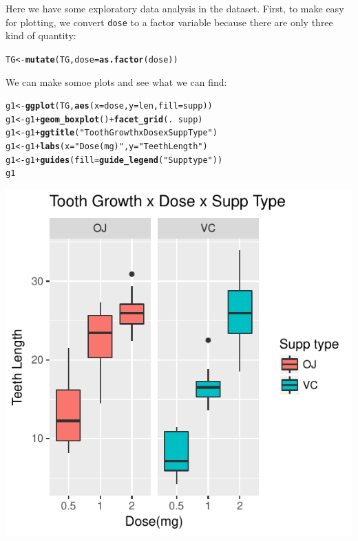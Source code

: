 \documentclass[a4paper, 12pt]{article}\usepackage[]{graphicx}\usepackage[]{color}
\makeatletter
\def\maxwidth{ %
  \ifdim\Gin@nat@width>\linewidth
    \linewidth
  \else
    \Gin@nat@width
  \fi
}
\newcommand{\hlstr}[1]{\textcolor[rgb]{0.192,0.494,0.8}{#1}}%
\newcommand{\hlopt}[1]{\textcolor[rgb]{0,0,0}{#1}}%
\newcommand{\hlstd}[1]{\textcolor[rgb]{0.345,0.345,0.345}{#1}}%
\newcommand{\hlkwb}[1]{\textcolor[rgb]{0.69,0.353,0.396}{#1}}%
\newcommand{\hlkwc}[1]{\textcolor[rgb]{0.333,0.667,0.333}{#1}}%
\newcommand{\hlkwd}[1]{\textcolor[rgb]{0.737,0.353,0.396}{\textbf{#1}}}%
\newenvironment{kframe}{%
 \def\at@end@of@kframe{}%
 \ifinner\ifhmode%
  \def\at@end@of@kframe{\end{minipage}}%
  \begin{minipage}{\columnwidth}%
 \fi\fi%
 \def\FrameCommand##1{\hskip\@totalleftmargin \hskip-\fboxsep
 \colorbox{shadecolor}{##1}\hskip-\fboxsep
     \hskip-\linewidth \hskip-\@totalleftmargin \hskip\columnwidth}%
 \MakeFramed {\advance\hsize-\width
   \@totalleftmargin\z@ \linewidth\hsize
   \@setminipage}}%
 {\par\unskip\endMakeFramed%
 \at@end@of@kframe}
\newenvironment{knitrout}{}{} %
\makeatother
\begin{document}
	Here we have some exploratory data analysis in the dataset.  First, to make easy for plotting, we convert \texttt{dose} to a factor variable because there are only three kind of quantity:
\begin{knitrout}\small
{}\color{fgcolor}\begin{kframe}
\begin{alltt}
\hlstd{TG} \hlkwb{<-} \hlkwd{mutate}\hlstd{(TG,} \hlkwc{dose} \hlstd{=} \hlkwd{as.factor}\hlstd{(dose))}
\end{alltt}
\end{kframe}
\end{knitrout}
  We can make somoe plots and see what we can find:
\begin{knitrout}\small
{}\color{fgcolor}\begin{kframe}
\begin{alltt}
\hlstd{g1} \hlkwb{<-} \hlkwd{ggplot}\hlstd{(TG,} \hlkwd{aes}\hlstd{(}\hlkwc{x}\hlstd{=dose,} \hlkwc{y}\hlstd{=len,} \hlkwc{fill}\hlstd{=supp))}
\hlstd{g1} \hlkwb{<-} \hlstd{g1} \hlopt{+} \hlkwd{geom_boxplot}\hlstd{()} \hlopt{+} \hlkwd{facet_grid}\hlstd{(.}\hlopt{~}\hlstd{supp)}
\hlstd{g1} \hlkwb{<-} \hlstd{g1} \hlopt{+} \hlkwd{ggtitle}\hlstd{(}\hlstr{"Tooth Growth x Dose x Supp Type"}\hlstd{)}
\hlstd{g1} \hlkwb{<-} \hlstd{g1} \hlopt{+} \hlkwd{labs}\hlstd{(}\hlkwc{x} \hlstd{=} \hlstr{"Dose(mg)"}\hlstd{,} \hlkwc{y} \hlstd{=} \hlstr{"Teeth Length"}\hlstd{)}
\hlstd{g1} \hlkwb{<-} \hlstd{g1} \hlopt{+} \hlkwd{guides}\hlstd{(}\hlkwc{fill}\hlstd{=}\hlkwd{guide_legend}\hlstd{(}\hlstr{"Supp type"}\hlstd{))}
\hlstd{g1}
\end{alltt}
\end{kframe}

{\centering \includegraphics[width=\maxwidth]{figure/plot1-1} 

}



\end{knitrout}
\end{document}

